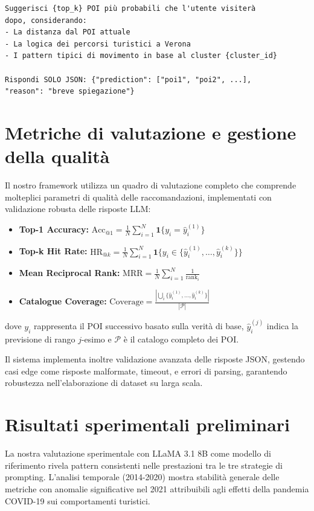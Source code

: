 \begin{itemize}
\begin{lstlisting}[language=text, caption=Template di Prompt Comprensivo]
Suggerisci {top_k} POI più probabili che l'utente visiterà 
dopo, considerando:
- La distanza dal POI attuale
- La logica dei percorsi turistici a Verona  
- I pattern tipici di movimento in base al cluster {cluster_id}

Rispondi SOLO JSON: {"prediction": ["poi1", "poi2", ...], 
"reason": "breve spiegazione"}
\end{lstlisting}

\section{Metriche di valutazione e gestione della qualità}

Il nostro framework utilizza un quadro di valutazione completo che comprende molteplici parametri di qualità delle raccomandazioni, implementati con validazione robusta delle risposte LLM:

\begin{itemize}
\item \textbf{Top-1 Accuracy:} $\text{Acc}_{@1} = \frac{1}{N}\sum_{i=1}^{N}\mathbf{1}\{y_i = \hat{y}_i^{(1)}\}$
\item \textbf{Top-k Hit Rate:} $\text{HR}_{@k} = \frac{1}{N}\sum_{i=1}^{N}\mathbf{1}\{y_i \in \{\hat{y}_i^{(1)}, \ldots, \hat{y}_i^{(k)}\}\}$
\item \textbf{Mean Reciprocal Rank:} $\text{MRR} = \frac{1}{N}\sum_{i=1}^{N}\frac{1}{\text{rank}_i}$
\item \textbf{Catalogue Coverage:} $\text{Coverage} = \frac{|\bigcup_{i}\{\hat{y}_i^{(1)}, \ldots, \hat{y}_i^{(k)}\}|}{|\mathcal{P}|}$
\end{itemize}

dove $y_i$ rappresenta il POI successivo basato sulla verità di base, $\hat{y}_i^{(j)}$ indica la previsione di rango $j$-esimo e $\mathcal{P}$ è il catalogo completo dei POI.

Il sistema implementa inoltre validazione avanzata delle risposte JSON, gestendo casi edge come risposte malformate, timeout, e errori di parsing, garantendo robustezza nell'elaborazione di dataset su larga scala.


\section{Risultati sperimentali preliminari}

La nostra valutazione sperimentale con LLaMA 3.1 8B come modello di riferimento rivela pattern consistenti nelle prestazioni tra le tre strategie di prompting. L'analisi temporale (2014-2020) mostra stabilità generale delle metriche con anomalie significative nel 2021 attribuibili agli effetti della pandemia COVID-19 sui comportamenti turistici.


\end{itemize}
